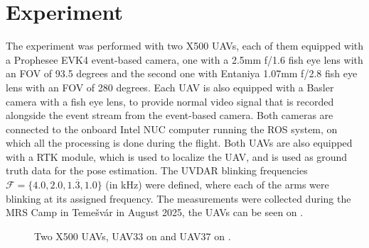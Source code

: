 
\chapter{Experiment\label{chap:experiment}}

The experiment was performed with two X500 \ac{UAV}s, each of them equipped with a Prophesee EVK4 event-based camera, one with a 2.5mm f/1.6
fish eye lens with an \ac{FOV} of 93.5 degrees and the second one with Entaniya 1.07mm f/2.8 fish eye lens with an \ac{FOV} of 280 degrees.
Each UAV is also equipped with a Basler camera with a fish eye lens, to provide normal video signal that is recorded alongside the event stream
from the event-based camera.
Both cameras are connected to the onboard Intel NUC computer running the ROS system, on which all the processing is done during the flight. Both 
\ac{UAV}s are also equipped with a \ac{RTK} module, which is used to localize the \ac{UAV}, and is used as ground truth data for the pose estimation.
The UVDAR blinking frequencies $\mathcal{F} = \{4.0, 2.0, 1.\overline{3}, 1.0\}$ (in kHz) were defined, where each of the arms were blinking at its assigned
frequency.
The measurements were collected during the \ac{MRS} Camp in Temešvár in August 2025, the \ac{UAV}s can be seen on .
\begin{figure}[H]
	\centering
	\caption{
		Two X500 UAVs, UAV33 on  and UAV37 on .
  }
	\label{fig:uav33_37}
\end{figure}
